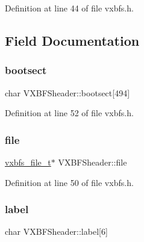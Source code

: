 Definition at line 44 of file vxbfs.\+h.



\subsection{Field Documentation}
\mbox{\label{a00330_ac10458b5241cce411ef4dd4fff029d0e_ac10458b5241cce411ef4dd4fff029d0e}} 
\subsubsection{\texorpdfstring{bootsect}{bootsect}}
{\footnotesize\ttfamily char V\+X\+B\+F\+Sheader\+::bootsect\mbox{[}494\mbox{]}}



Definition at line 52 of file vxbfs.\+h.

\mbox{\label{a00330_a3b903de5c5034494530cdc0c2d4ff9b1_a3b903de5c5034494530cdc0c2d4ff9b1}} 
\subsubsection{\texorpdfstring{file}{file}}
{\footnotesize\ttfamily \hyperlink{a00200_abb93e2407af0d8fe0f5629ce6456c6f9_abb93e2407af0d8fe0f5629ce6456c6f9}{vxbfs\+\_\+file\+\_\+t}$\ast$ V\+X\+B\+F\+Sheader\+::file}



Definition at line 50 of file vxbfs.\+h.

\mbox{\label{a00330_af3cd6b4358b6ba93a7bd541c09c959c8_af3cd6b4358b6ba93a7bd541c09c959c8}} 
\subsubsection{\texorpdfstring{label}{label}}
{\footnotesize\ttfamily char V\+X\+B\+F\+Sheader\+::label\mbox{[}6\mbox{]}}



